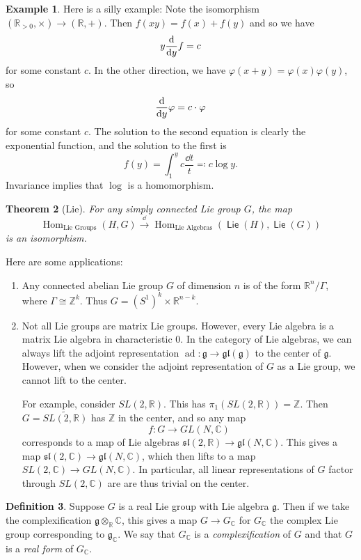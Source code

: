 \documentclass[leqno, openany]{memoir}
\newtheorem{thm}{Theorem}[section]
\theoremstyle{definition}
\newtheorem{defn}[thm]{Definition}
\newtheorem{exm}[thm]{Example}
\theoremstyle{remark}
\theoremstyle{plain}
\theoremstyle{definition}
\theoremstyle{remark}
\newcommand{\R}{\mathbb{R}}
\newcommand{\C}{\mathbb{C}}
\newcommand{\Z}{\mathbb{Z}}
\newcommand{\mf}[1]{\mathfrak{#1}}
\newcommand{\wtl}[1]{\widetilde{#1}}
\DeclareMathOperator{\Hom}{Hom}
\DeclareMathOperator{\ad}{ad}
\DeclareMathOperator{\Lie}{\mathsf{Lie}}
\begin{document}
\begin{exm}
    Here is a silly example: Note the isomorphism $(\R_{>0}, \times) \to (\R, +)$. Then $f(xy) = f(x) + f(y)$ and so we have
    \[ y \dv{y} f = c \]
    for some constant $c$. In the other direction, we have $\varphi(x+y) = \varphi(x) \varphi(y)$, so 
    \[ \dv{y} \varphi = c \cdot \varphi \]
    for some constant $c$. The solution to the second equation is clearly the exponential function, and the solution to the first is
    \[ f(y) = \int_1^y c \frac{\dd{t}}{t} \eqqcolon c \log y. \]
    Invariance implies that $\log$ is a homomorphism.
\end{exm}

\begin{thm}[Lie]
    For any simply connected Lie group $G$, the map
    \[ \Hom_{\text{Lie Groups}}(H,G) \xrightarrow{\dd} \Hom_{\text{Lie Algebras}}(\Lie(H), \Lie(G)) \]
    is an isomorphism.
\end{thm}

Here are some applications:
\begin{enumerate}
    \item Any connected abelian Lie group $G$ of dimension $n$ is of the form $\R^n / \Gamma$, where $\Gamma \cong \Z^k$. Thus $G = (S^1)^k \times \R^{n-k}$.
    \item Not all Lie groups are matrix Lie groups. However, every Lie algebra is a matrix Lie algebra in characteristic $0$. In the category of Lie algebras, we can always lift the adjoint representation $\ad \colon \mf{g} \to \mf{gl}(\mf{g})$ to the center of $\mf{g}$. However, when we consider the adjoint representation of $G$ as a Lie group, we cannot lift to the center.

        For example, consider $SL(2, \R)$. This has $\pi_1(SL(2, \R)) = \Z$. Then $G = \wtl{SL(2, \R)}$ has $\Z$ in the center, and so any map
        \[ f \colon G \to GL(N, \C) \]
        corresponds to a map of Lie algebras $\mf{sl}(2, \R) \to \mf{gl}(N, \C)$. This gives a map $\mf{sl}(2, \C) \to \mf{gl}(N, \C)$, which then lifts to a map $SL(2, \C) \to GL(N, \C)$. In particular, all linear representations of $G$ factor through $SL(2, \C)$ are are thus trivial on the center.
\end{enumerate}

\begin{defn}
    Suppose $G$ is a real Lie group with Lie algebra $\mf{g}$. Then if we take the complexification $\mf{g} \otimes_{\R} \C$, this gives a map $G \to G_{\C}$ for $G_{\C}$ the complex Lie group corresponding to $\mf{g}_{\C}$. We say that $G_{\C}$ is a \textit{complexification} of $G$ and that $G$ is a \textit{real form} of $G_{\C}$.  
\end{defn}
\end{document}
